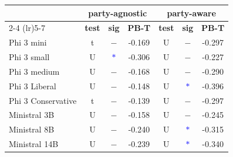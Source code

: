 
    \begin{table}[h]
        \centering
        {\small
        \setlength{\tabcolsep}{3.5pt}
        \begin{tabular}{@{}l|ccc|ccc@{}}
            \toprule
            \multirow{2}{*}{\textbf{}} & \multicolumn{3}{c}{\textbf{party-agnostic}} & \multicolumn{3}{c}{\textbf{party-aware}} \\
            \cmidrule(lr){2-4} \cmidrule(lr){5-7}
            & \textbf{test} & \textbf{sig} & \textbf{PB-T} & \textbf{test} & \textbf{sig} & \textbf{PB-T} \\
            \midrule
            \cellcolor{gray!10}Phi 3 mini & \cellcolor{gray!10}t & \cellcolor{gray!10}$-$ & \cellcolor{gray!10}-0.169 & \cellcolor{gray!10}U & \cellcolor{gray!10}$-$ & \cellcolor{gray!10}-0.297 \\
        \cellcolor{gray!70!black!10}Phi 3 small & \cellcolor{gray!70!black!10}U & \cellcolor{gray!70!black!10}\textcolor{blue}{$\ast$} & \cellcolor{gray!70!black!10}-0.306 & \cellcolor{gray!70!black!10}U & \cellcolor{gray!70!black!10}$-$ & \cellcolor{gray!70!black!10}-0.227 \\
        \cellcolor{gray!40!black!10}Phi 3 medium & \cellcolor{gray!40!black!10}U & \cellcolor{gray!40!black!10}$-$ & \cellcolor{gray!40!black!10}-0.168 & \cellcolor{gray!40!black!10}U & \cellcolor{gray!40!black!10}$-$ & \cellcolor{gray!40!black!10}-0.290 \\
        \cellcolor{blue!10}Phi 3 Liberal & \cellcolor{blue!10}U & \cellcolor{blue!10}$-$ & \cellcolor{blue!10}-0.148 & \cellcolor{blue!10}U & \cellcolor{blue!10}\textcolor{blue}{$\ast$} & \cellcolor{blue!10}-0.396 \\
        \cellcolor{red!10}Phi 3 Conservative & \cellcolor{red!10}t & \cellcolor{red!10}$-$ & \cellcolor{red!10}-0.139 & \cellcolor{red!10}U & \cellcolor{red!10}$-$ & \cellcolor{red!10}-0.297 \\
        \cellcolor{violet!10}Ministral 3B & \cellcolor{violet!10}U & \cellcolor{violet!10}$-$ & \cellcolor{violet!10}-0.158 & \cellcolor{violet!10}U & \cellcolor{violet!10}$-$ & \cellcolor{violet!10}-0.245 \\
        \cellcolor{magenta!10}Ministral 8B & \cellcolor{magenta!10}U & \cellcolor{magenta!10}$-$ & \cellcolor{magenta!10}-0.240 & \cellcolor{magenta!10}U & \cellcolor{magenta!10}\textcolor{blue}{$\ast$} & \cellcolor{magenta!10}-0.315 \\
        \cellcolor{purple!10}Ministral 14B & \cellcolor{purple!10}U & \cellcolor{purple!10}$-$ & \cellcolor{purple!10}-0.239 & \cellcolor{purple!10}U & \cellcolor{purple!10}\textcolor{blue}{$\ast$} & \cellcolor{purple!10}-0.340 \\

\end{tabular}}
\end{table}
